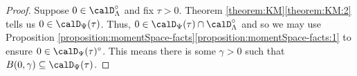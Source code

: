 \begin{proof}
  \label{proof:corollary:big-time-small-moments}
  Suppose $0 \in \odeSpace^\circ$ and fix $\tau > 0$.
  Theorem \ref{theorem:KM}\ref{theorem:KM:2} tells us $0 \in \momentSpace(\tau)$. Thus, $0 \in \momentSpace(\tau) \cap \odeSpace^\circ$ and so we may use Proposition \ref{proposition:momentSpace-facts}\ref{proposition:momentSpace-facts:1} to ensure $0 \in \momentSpace(\tau)^\circ$.
  This means there is some $\gamma > 0$ such that $B(0,\gamma) \subseteq \momentSpace(\tau)$.
\end{proof}

